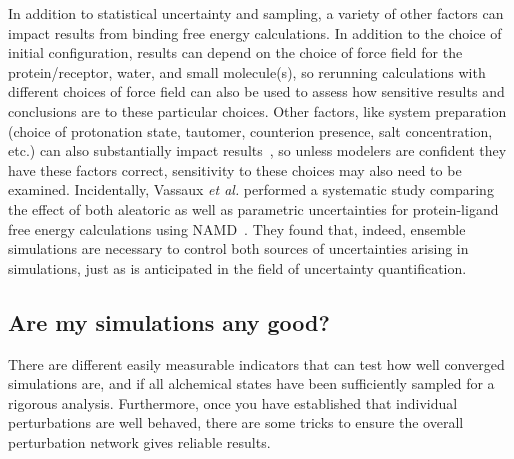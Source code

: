 \documentclass[9pt,bestpractices]{livecoms}
\begin{document}
In addition to statistical uncertainty and sampling, a variety of other factors can impact results from binding free energy calculations. In addition to the choice of initial configuration, results can depend on the choice of force field for the protein/receptor, water, and small molecule(s), so rerunning calculations with different choices of force field can also be used to assess how sensitive results and conclusions are to these particular choices. Other factors, like system preparation (choice of protonation state, tautomer, counterion presence, salt concentration, etc.) can also substantially impact results~\cite{mobley2017predicting, mobley2017predictinga}, so unless modelers are confident they have these factors correct, sensitivity to these choices may also need to be examined.
Incidentally, Vassaux \textit{et al.} performed a systematic study comparing the effect of both aleatoric as well as parametric uncertainties for protein-ligand free energy calculations using NAMD~\cite{vassaux2021}. They found that, indeed, ensemble simulations are necessary to control both sources of uncertainties arising in simulations, just as is anticipated in the field of uncertainty quantification.

\subsection{Are my simulations any good?}
\label{sec:are-they-good}
There are different easily measurable indicators that can test how well converged simulations are, and if all alchemical states have been sufficiently sampled for a rigorous analysis. Furthermore, once you have established that individual perturbations are well behaved, there are some tricks to ensure the overall perturbation network gives reliable results.
\end{document}
